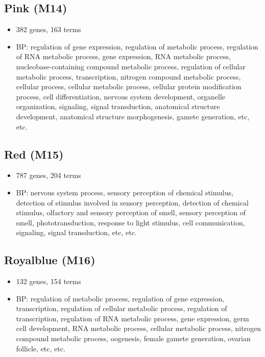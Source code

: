 \documentclass[]{article}
\providecommand{\tightlist}{%
  \setlength{\itemsep}{0pt}\setlength{\parskip}{0pt}}
\begin{document}
\hypertarget{pink-m14}{%
\subsection{Pink (M14)}\label{pink-m14}}

\begin{itemize}
\tightlist
\item
  382 genes, 163 terms
\item
  BP: regulation of gene expression, regulation of metabolic process,
  regulation of RNA metabolic process, gene expression, RNA metabolic
  process, nucleobase-containing compound metabolic process, regulation
  of cellular metabolic process, transcription, nitrogen compound
  metabolic process, cellular process, cellular metabolic process,
  cellular protein modification process, cell differentiation, nervous
  system development, organelle organization, signaling, signal
  transduction, anatomical structure development, anatomical structure
  morphogenesis, gamete generation, etc, etc.
\end{itemize}

\hypertarget{red-m15}{%
\subsection{Red (M15)}\label{red-m15}}

\begin{itemize}
\tightlist
\item
  787 genes, 204 terms
\item
  BP: nervous system process, sensory perception of chemical stimulus,
  detection of stimulus involved in sensory perception, detection of
  chemical stimulus, olfactory and sensory perception of smell, sensory
  perception of smell, phototransduction, response to light stimulus,
  cell communication, signaling, signal transduction, etc, etc.
\end{itemize}

\hypertarget{royalblue-m16}{%
\subsection{Royalblue (M16)}\label{royalblue-m16}}

\begin{itemize}
\tightlist
\item
  132 genes, 154 terms
\item
  BP: regulation of metabolic process, regulation of gene expression,
  transcription, regulation of cellular metabolic process, regulation of
  transcription, regulation of RNA metabolic process, gene expression,
  germ cell development, RNA metabolic process, cellular metabolic
  process, nitrogen compound metabolic process, oogenesis, female gamete
  generation, ovarian follicle, etc, etc.
\end{itemize}
\end{document}
